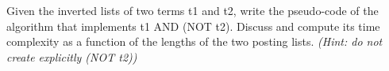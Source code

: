 \exercise

Given the inverted lists of two terms t1 and t2, write the pseudo-code of the
algorithm that implements t1 AND (NOT t2). Discuss and compute its time
complexity as a function of the lengths of the two posting lists.  \emph{(Hint:
do not create explicitly (NOT t2))}

\solution

